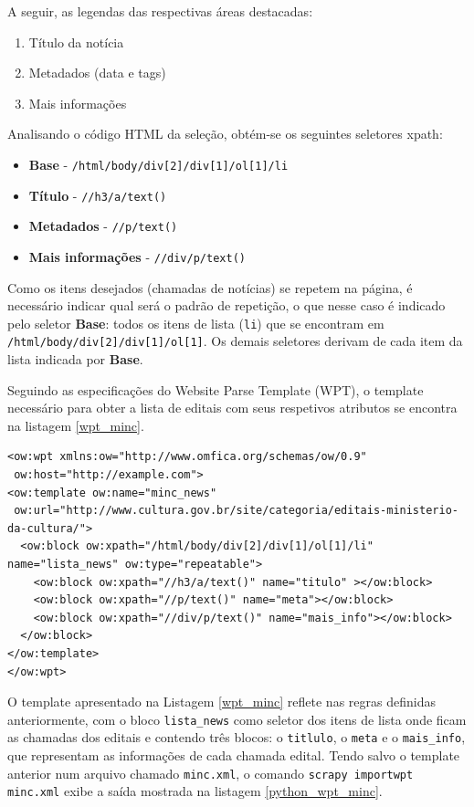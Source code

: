 A seguir, as legendas das respectivas áreas destacadas:

\begin{enumerate}
	\item Título da notícia
	\item Metadados (data e tags)
	\item Mais informações
\end{enumerate}

Analisando o código HTML da seleção, obtém-se os seguintes seletores \gls{xpath}:

\begin{itemize}
	\item \textbf{Base} - \texttt{/html/body/div[2]/div[1]/ol[1]/li}
	\item \textbf{Título} - \texttt{//h3/a/text()}
	\item \textbf{Metadados} - \texttt{//p/text()}
	\item \textbf{Mais informações} - \texttt{//div/p/text()}
\end{itemize}

Como os itens desejados (chamadas de notícias) se repetem na página, é necessário indicar qual será o padrão de repetição, o que nesse caso é indicado pelo seletor \textbf{Base}: todos os itens de lista (\texttt{li}) que se encontram em \texttt{/html/body/div[2]/div[1]/ol[1]}. Os demais seletores derivam de cada item da lista indicada por \textbf{Base}.

Seguindo as especificações do Website Parse Template (WPT), o template necessário para obter a lista de editais com seus respetivos atributos se encontra na listagem \ref{wpt_minc}.

\begin{lstlisting}[label=wpt_minc]
<ow:wpt xmlns:ow="http://www.omfica.org/schemas/ow/0.9"
 ow:host="http://example.com">
<ow:template ow:name="minc_news" 
 ow:url="http://www.cultura.gov.br/site/categoria/editais-ministerio-da-cultura/">
  <ow:block ow:xpath="/html/body/div[2]/div[1]/ol[1]/li" name="lista_news" ow:type="repeatable">
    <ow:block ow:xpath="//h3/a/text()" name="titulo" ></ow:block>
    <ow:block ow:xpath="//p/text()" name="meta"></ow:block>
    <ow:block ow:xpath="//div/p/text()" name="mais_info"></ow:block>
  </ow:block>
</ow:template> 
</ow:wpt>
\end{lstlisting}

O template apresentado na Listagem \ref{wpt_minc} reflete nas regras definidas anteriormente, com o bloco \texttt{lista\_news} como seletor dos itens de lista onde ficam as chamadas dos editais e contendo três blocos: o \texttt{titlulo}, o \texttt{meta} e o \texttt{mais\_info}, que representam as informações de cada chamada edital. Tendo salvo o template anterior num arquivo chamado \texttt{minc.xml}, o comando \texttt{scrapy importwpt minc.xml} exibe a saída mostrada na listagem \ref{python_wpt_minc}.

